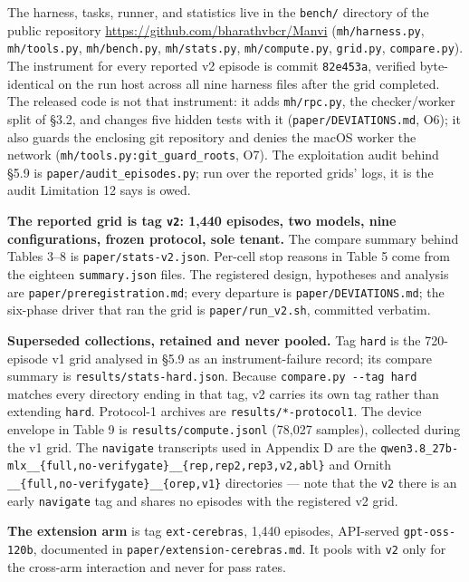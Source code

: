 \documentclass[
  10pt,
  a4paper,
]{article}
\let\oldtexttt\texttt
\renewcommand{\texttt}[1]{{\small\oldtexttt{#1}}}
\begin{document}
The harness, tasks, runner, and statistics live in the \texttt{bench/}
directory of the public repository
\url{https://github.com/bharathvbcr/Manvi} (\texttt{mh/harness.py},
\texttt{mh/tools.py}, \texttt{mh/bench.py}, \texttt{mh/stats.py},
\texttt{mh/compute.py}, \texttt{grid.py}, \texttt{compare.py}). The
instrument for every reported v2 episode is commit \texttt{82e453a},
verified byte-identical on the run host across all nine harness files
after the grid completed. The released code is not that instrument: it
adds \texttt{mh/rpc.py}, the checker/worker split of §3.2, and changes
five hidden tests with it (\texttt{paper/DEVIATIONS.md}, O6); it also
guards the enclosing git repository and denies the macOS worker the
network (\texttt{mh/tools.py:git\_guard\_roots}, O7). The exploitation
audit behind §5.9 is \texttt{paper/audit\_episodes.py}; run over the
reported grids' logs, it is the audit Limitation 12 says is owed.

\textbf{The reported grid is tag \texttt{v2}: 1,440 episodes, two
models, nine configurations, frozen protocol, sole tenant.} The compare
summary behind Tables 3--8 is \texttt{paper/stats-v2.json}. Per-cell
stop reasons in Table 5 come from the eighteen \texttt{summary.json}
files. The registered design, hypotheses and analysis are
\texttt{paper/preregistration.md}; every departure is
\texttt{paper/DEVIATIONS.md}; the six-phase driver that ran the grid is
\texttt{paper/run\_v2.sh}, committed verbatim.

\textbf{Superseded collections, retained and never pooled.} Tag
\texttt{hard} is the 720-episode v1 grid analysed in §5.9 as an
instrument-failure record; its compare summary is
\texttt{results/stats-hard.json}. Because
\texttt{compare.py\ -\/-tag\ hard} matches every directory ending in
that tag, v2 carries its own tag rather than extending \texttt{hard}.
Protocol-1 archives are \texttt{results/*-protocol1}. The device
envelope in Table 9 is \texttt{results/compute.jsonl} (78,027 samples),
collected during the v1 grid. The \texttt{navigate} transcripts used in
Appendix D are the
\texttt{qwen3.8\_27b-mlx\_\_\{full,no-verifygate\}\_\_\{rep,rep2,rep3,v2,abl\}}
and Ornith \texttt{\_\_\{full,no-verifygate\}\_\_\{orep,v1\}}
directories --- note that the \texttt{v2} there is an early
\texttt{navigate} tag and shares no episodes with the registered v2
grid.

\textbf{The extension arm} is tag \texttt{ext-cerebras}, 1,440 episodes,
API-served \texttt{gpt-oss-120b}, documented in
\texttt{paper/extension-cerebras.md}. It pools with \texttt{v2} only for
the cross-arm interaction and never for pass rates.
\end{document}
